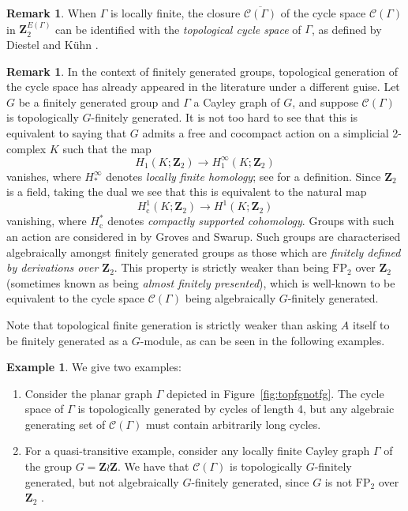 \documentclass[11pt,a4paper]{amsart}
\newcommand{\Z}{\mathbf{Z}}
\theoremstyle{definition}
\newtheorem{example}[theorem]{Example}
\newtheorem{remark}[theorem]{Remark}
\newcommand{\cyc}{\mathscr{C}}
\begin{document}
\begin{remark}
    When $\Gamma$ is locally finite, the closure  $\overline {\cyc(\Gamma)}$ of the cycle space $\cyc(\Gamma)$ in $\Z_2^{E(\Gamma)}$  can be identified with the \emph{topological cycle space} of $\Gamma$, as defined by Diestel and K\"uhn \cite{diestel2004infinite}.
\end{remark}

\begin{remark}\label{rem:derivations}
    In the context of finitely generated groups, topological generation of the cycle space has already appeared in the literature under a different guise. Let $G$ be a finitely generated group and $\Gamma$ a Cayley graph of $G$, and suppose $\cyc(\Gamma)$ is topologically $G$-finitely generated. It is not too hard to see that this is equivalent to saying that $G$ admits a free and cocompact action on a simplicial 2-complex $K$ such that the map
    $$
    H_1(K;\Z_2 ) \to H_1^\infty(K;\Z_2 )
    $$
    vanishes, where $H_\ast^\infty$ denotes \emph{locally finite homology}; see \cite[\S11]{geoghegan2008topological} for a definition. Since $\Z_2 $ is a field, taking the dual we see that this is equivalent to the natural map
    $$
    H^1_{\mathrm{c}}(K;\Z_2 ) \to H^1(K;\Z_2 )
    $$
    vanishing, where $H^\ast_{\mathrm{c}}$ denotes \emph{compactly supported cohomology}. Groups with such an action are considered in \cite{groves1991remarks} by Groves and Swarup. Such groups are characterised algebraically amongst finitely generated groups as those which are \emph{finitely defined by derivations over $\Z_2 $}. This property is strictly weaker than being $\mathrm{FP}_2$ over $\Z_2 $ (sometimes known as being \emph{almost finitely presented}), which is well-known to be equivalent to the cycle space $\cyc(\Gamma)$ being algebraically $G$-finitely generated.
\end{remark}

Note that topological finite generation is strictly weaker than asking $A$ itself to be finitely generated as a $G$-module, as can be seen in the following examples.

\begin{example}
    We give two examples:
    \begin{enumerate}
        \item Consider the planar graph $\Gamma$ depicted in Figure~\ref{fig:topfgnotfg}. The cycle space of $\Gamma$ is topologically generated by cycles of length 4, but any algebraic generating set of $\cyc(\Gamma)$ must contain arbitrarily long cycles.

        \item For a quasi-transitive example, consider any locally finite Cayley graph $\Gamma$ of the group $G = \Z \wr \Z$. We have that $\cyc(\Gamma)$ is topologically $G$-finitely generated, but not algebraically $G$-finitely generated, since $G$ is not $\mathrm{FP}_2$ over $\Z_2 $ \cite{groves1991remarks}.
    \end{enumerate}
\end{example}
\end{document}
